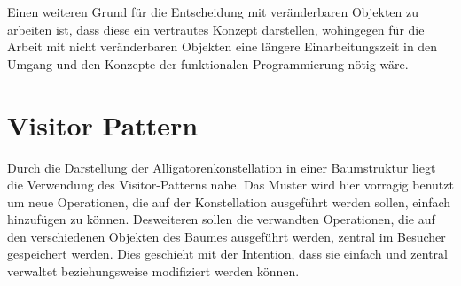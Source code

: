 Einen weiteren Grund für die Entscheidung mit veränderbaren Objekten zu arbeiten ist, dass diese ein vertrautes Konzept darstellen, wohingegen für die Arbeit mit nicht veränderbaren Objekten eine längere Einarbeitungszeit in den Umgang und den Konzepte der funktionalen Programmierung nötig wäre.

\section{Visitor Pattern}
Durch die Darstellung der Alligatorenkonstellation in einer Baumstruktur liegt die Verwendung des Visitor-Patterns nahe.
Das Muster wird hier vorragig benutzt um neue Operationen, die auf der Konstellation ausgeführt werden sollen, einfach hinzufügen zu können.
Desweiteren sollen die verwandten Operationen, die auf den verschiedenen Objekten des Baumes ausgeführt werden, zentral im Besucher gespeichert werden. Dies geschieht mit der Intention, dass sie einfach und zentral verwaltet beziehungsweise modifiziert werden können.

